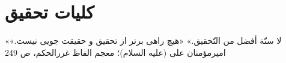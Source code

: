 \chapter{کلیات تحقیق}
\label{ch1}
\bottomquote
{«لا سنّة أفضل من التّحقیق.»}
{«هیچ راهی برتر از تحقیق و حقیقت جویی نیست.»}
{امیرمؤمنان علی (علیه السلام)؛ معجم الفاظ غررالحکم، ص 249}
\clearpage


